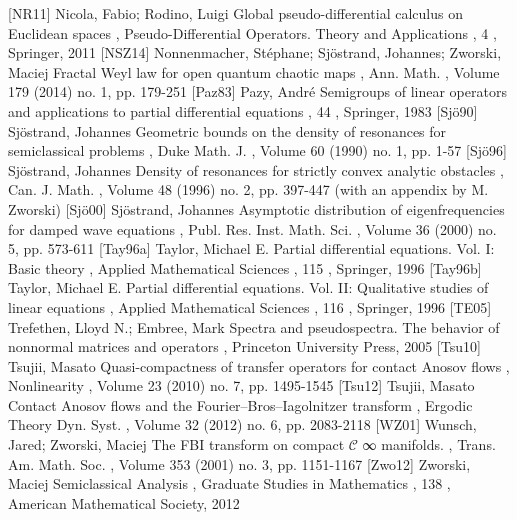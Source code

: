  [NR11] Nicola, Fabio; Rodino, Luigi Global pseudo-differential calculus on Euclidean spaces , Pseudo-Differential Operators. Theory and Applications , 4 , Springer, 2011
 [NSZ14] Nonnenmacher, Stéphane; Sjöstrand, Johannes; Zworski, Maciej Fractal Weyl law for open quantum chaotic maps , Ann. Math. , Volume 179 (2014) no. 1, pp. 179-251
 [Paz83] Pazy, André Semigroups of linear operators and applications to partial differential equations , 44 , Springer, 1983
 [Sjö90] Sjöstrand, Johannes Geometric bounds on the density of resonances for semiclassical problems , Duke Math. J. , Volume 60 (1990) no. 1, pp. 1-57
 [Sjö96] Sjöstrand, Johannes Density of resonances for strictly convex analytic obstacles , Can. J. Math. , Volume 48 (1996) no. 2, pp. 397-447 (with an appendix by M. Zworski)
 [Sjö00] Sjöstrand, Johannes Asymptotic distribution of eigenfrequencies for damped wave equations , Publ. Res. Inst. Math. Sci. , Volume 36 (2000) no. 5, pp. 573-611
 [Tay96a] Taylor, Michael E. Partial differential equations. Vol. I: Basic theory , Applied Mathematical Sciences , 115 , Springer, 1996
 [Tay96b] Taylor, Michael E. Partial differential equations. Vol. II: Qualitative studies of linear equations , Applied Mathematical Sciences , 116 , Springer, 1996
 [TE05] Trefethen, Lloyd N.; Embree, Mark Spectra and pseudospectra. The behavior of nonnormal matrices and operators , Princeton University Press, 2005
 [Tsu10] Tsujii, Masato Quasi-compactness of transfer operators for contact Anosov flows , Nonlinearity , Volume 23 (2010) no. 7, pp. 1495-1545
 [Tsu12] Tsujii, Masato Contact Anosov flows and the Fourier–Bros–Iagolnitzer transform , Ergodic Theory Dyn. Syst. , Volume 32 (2012) no. 6, pp. 2083-2118
 [WZ01] Wunsch, Jared; Zworski, Maciej The FBI transform on compact $\mathcal{C}$ ∞ manifolds. , Trans. Am. Math. Soc. , Volume 353 (2001) no. 3, pp. 1151-1167
 [Zwo12] Zworski, Maciej Semiclassical Analysis , Graduate Studies in Mathematics , 138 , American Mathematical Society, 2012
